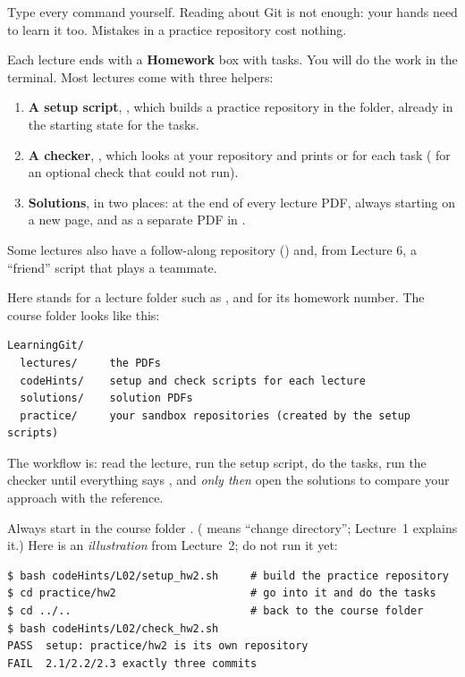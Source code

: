 \begin{keyidea}
Type every command yourself. Reading about Git is not enough: your hands need to learn it too. Mistakes in a practice repository cost nothing.
\end{keyidea}

Each lecture ends with a \textbf{Homework} box with tasks. You will do the work in the terminal. Most lectures come with three helpers:

\begin{enumerate}
  \item \textbf{A setup script}, , which builds a practice repository in the  folder, already in the starting state for the tasks.
  \item \textbf{A checker}, , which looks at your repository and prints  or  for each task ( for an optional check that could not run).
  \item \textbf{Solutions}, in two places: at the end of every lecture PDF, always starting on a new page, and as a separate PDF in .
\end{enumerate}
Some lectures also have a follow-along repository () and, from Lecture 6, a ``friend'' script that plays a teammate.

Here  stands for a lecture folder such as , and  for its homework number. The course folder looks like this:
\begin{lstlisting}
LearningGit/
  lectures/     the PDFs
  codeHints/    setup and check scripts for each lecture
  solutions/    solution PDFs
  practice/     your sandbox repositories (created by the setup scripts)
\end{lstlisting}
The workflow is: read the lecture, run the setup script, do the tasks, run the checker until everything says , and \emph{only then} open the solutions to compare your approach with the reference.

Always start in the course folder . ( means ``change directory''; Lecture~1 explains it.) Here is an \emph{illustration} from Lecture~2; do not run it yet:
\begin{lstlisting}
$ bash codeHints/L02/setup_hw2.sh     # build the practice repository
$ cd practice/hw2                     # go into it and do the tasks
$ cd ../..                            # back to the course folder
$ bash codeHints/L02/check_hw2.sh
PASS  setup: practice/hw2 is its own repository
FAIL  2.1/2.2/2.3 exactly three commits
\end{lstlisting}


